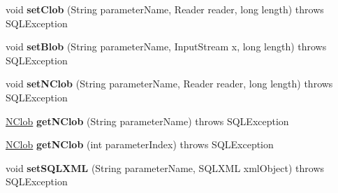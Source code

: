 \begin{DoxyCompactItemize}
\item 
\mbox{\label{classcom_1_1mysql_1_1cj_1_1jdbc_1_1_callable_statement_wrapper_a4f0c0d2c54d1f606b358f14cd813c512}} 
void {\bfseries set\+Clob} (String parameter\+Name, Reader reader, long length)  throws S\+Q\+L\+Exception 
\item 
\mbox{\label{classcom_1_1mysql_1_1cj_1_1jdbc_1_1_callable_statement_wrapper_a1974f16b798c706bd3681e3389f53fe3}} 
void {\bfseries set\+Blob} (String parameter\+Name, Input\+Stream x, long length)  throws S\+Q\+L\+Exception 
\item 
\mbox{\label{classcom_1_1mysql_1_1cj_1_1jdbc_1_1_callable_statement_wrapper_a4935cb1ad5e7c4f68ce3a3a5f7e2b542}} 
void {\bfseries set\+N\+Clob} (String parameter\+Name, Reader reader, long length)  throws S\+Q\+L\+Exception 
\item 
\mbox{\label{classcom_1_1mysql_1_1cj_1_1jdbc_1_1_callable_statement_wrapper_af5b953f4902e3556ae6413d8a4511d67}} 
\mbox{\hyperlink{classcom_1_1mysql_1_1cj_1_1jdbc_1_1_n_clob}{N\+Clob}} {\bfseries get\+N\+Clob} (String parameter\+Name)  throws S\+Q\+L\+Exception 
\item 
\mbox{\label{classcom_1_1mysql_1_1cj_1_1jdbc_1_1_callable_statement_wrapper_abe8d5eac91ef25deeb1ea7d93347f4ab}} 
\mbox{\hyperlink{classcom_1_1mysql_1_1cj_1_1jdbc_1_1_n_clob}{N\+Clob}} {\bfseries get\+N\+Clob} (int parameter\+Index)  throws S\+Q\+L\+Exception 
\item 
\mbox{\label{classcom_1_1mysql_1_1cj_1_1jdbc_1_1_callable_statement_wrapper_a885797b88f92cf77bf9db32504077b0c}} 
void {\bfseries set\+S\+Q\+L\+X\+ML} (String parameter\+Name, S\+Q\+L\+X\+ML xml\+Object)  throws S\+Q\+L\+Exception 
\item 
\mbox{\label{classcom_1_1mysql_1_1cj_1_1jdbc_1_1_callable_statement_wrapper_acaea5b4f0f7a3c49b2aa04b100b5ba97}} 

\end{DoxyCompactItemize}
